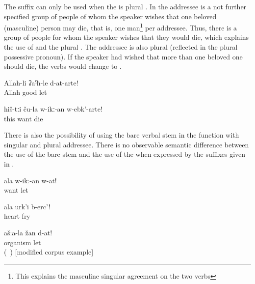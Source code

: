 The suffix  can only be used when the  is plural .  In  the addressee is a not further specified group of people of whom the speaker wishes that one beloved (masculine) person may die, that is, one man\footnote{This explains the masculine singular agreement on the two verbs} per addressee. Thus, there is a group of people for whom the speaker wishes that they would die, which explains the use of  and the plural . The addressee is also plural (reflected in the plural possessive pronoun). If the speaker had wished that more than one beloved one should die, the verbs would change to .
%
\begin{exe}
	\ex	\label{ex:‎‎‎May Allah leave you (plural) well}
	\gll	Allah-li	ʡaˁħ-le	d-at-arte!\\
		Allah	good	let\\
	\glt	{}

	\ex	\label{ex:‎May their beloved ones die}
	\gll	hiš-tːi	ču-la	w-ikː-an	w-ebk'-arte!\\
		this		want	die\\
	\glt	{}
\end{exe}

There is also the possibility of using the bare verbal stem in the  function  with singular and plural addressee. There is no observable semantic difference between the use of the bare stem and the use of the  when expressed by the suffixes given in .
%
\begin{exe}
	\ex	\label{ex:May your beloved (son) be left (in peace, alive)}
	\gll	ala	w-ikː-an	w-at!\\
			want	let\\
	\glt	{}

	\ex	\label{ex:May your heart char}
	\gll	ala	urk'i	b-erc'!\\
			heart	fry\\
	\glt	{}

	\ex	\label{ex:May your bodies and souls remain}
	\gll	ašːa-la	žan	d-at!\\
			organism	let\\
	\glt	{} (\tie\ ) [modified corpus example]
\end{exe}

